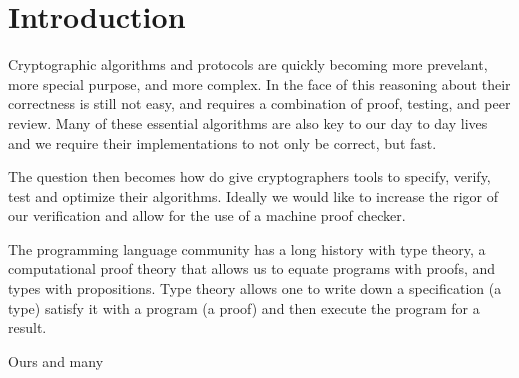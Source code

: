 \section{Introduction}

Cryptographic algorithms and protocols are quickly becoming more prevelant,
more special purpose, and more complex. In the face of this reasoning about their
correctness is still not easy, and requires a combination of proof, testing,
and peer review. Many of these essential algorithms are also key to our day to
day lives and we require their implementations to not only be correct, but fast.

The question then becomes how do give cryptographers tools to specify, verify,
test and optimize their algorithms. Ideally we would like to increase the rigor
of our verification and allow for the use of a machine proof checker.

The programming language community has a long history with type theory, a
computational proof theory that allows us to equate programs with proofs,
and types with propositions. Type theory allows one to write down a
specification (a type) satisfy it with a program (a proof) and then execute
the program for a result.

Ours and many
